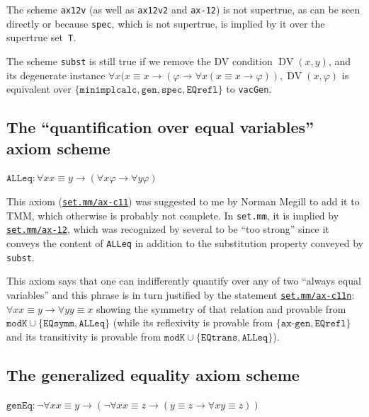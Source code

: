 \documentclass[11pt]{article}
\renewcommand*{\phi}{\varphi}
\DeclareMathOperator{\DV}{DV}
\theoremstyle{plain}
\theoremstyle{definition}
\theoremstyle{remark}
\begin{document}
The scheme \texttt{ax12v} (as well as \texttt{ax12v2} and \texttt{ax-12}) is not supertrue, as can
be seen directly or because \texttt{spec}, which is not supertrue, is implied by it over the
supertrue set~\texttt{T}.

The scheme \texttt{subst} is still true if we remove the DV condition $\DV(x, y)$, and its degenerate
instance $\forall x (x \equiv x \to (\phi \to \forall x (x \equiv x \to \phi)), \DV(x, \phi)$
is equivalent over $\{\texttt{minimplcalc}, \texttt{gen}, \texttt{spec}, \texttt{EQrefl} \}$
to \texttt{vacGen}.


\subsection{The ``quantification over equal variables'' axiom scheme}

$\texttt{ALLeq}:
\forall x x \equiv y \to (\forall x \phi \to \forall y \phi)$
\vspace{0.5em}

This axiom (\href{https://us.metamath.org/mpeuni/ax-c11.html}{\texttt{set.mm/ax-c11}}) was
suggested to me by Norman Megill to add it to TMM, which otherwise is probably not complete.
In \texttt{set.mm}, it is implied by
\href{https://us.metamath.org/mpeuni/ax-12.html}{\texttt{set.mm/ax-12}}, which was recognized by
several to be ``too strong'' since it conveys the content of \texttt{ALLeq} in addition to the
substitution property conveyed by \texttt{subst}.

This axiom says that one can indifferently quantify over any of two ``always equal variables\rlap{,}''
and this phrase is in turn justified by the statement
\href{https://us.metamath.org/mpeuni/ax-c11n.html}{\texttt{set.mm/ax-c11n}}:
$\forall x x \equiv y \to \forall y y \equiv x$ showing the symmetry of that relation and
provable from $\texttt{modK} \cup \{\texttt{EQsymm}, \texttt{ALLeq}\}$ (while its reflexivity is
provable from $\{\texttt{ax-gen}, \texttt{EQrefl}\}$ and its transitivity is
provable from $\texttt{modK} \cup \{\texttt{EQtrans}, \texttt{ALLeq}\}$).



\subsection{The generalized equality axiom scheme}

$\texttt{genEq}:
\neg \forall x x \equiv y \to (\neg \forall x x \equiv z \to (y \equiv z \to \forall x y \equiv z))$
\vspace{0.5em}
\end{document}
